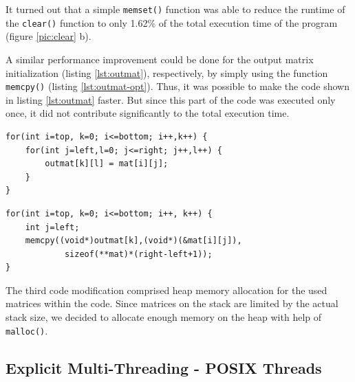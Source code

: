 \documentclass[conference]{IEEEtran}
\begin{document}
It turned out that a simple \texttt{memset()} function was able to reduce the runtime of the \texttt{clear()} function to only 1.62\% of the total execution time of the program (figure \ref{pic:clear} b).

A similar performance improvement could be done for the output matrix initialization (listing \ref{lst:outmat}), respectively, by simply using the function \texttt{memcpy()} (listing \ref{lst:outmat-opt}). Thus, it was possible to make the code shown in listing \ref{lst:outmat} faster. But since this part of the code was executed only once, it did not contribute significantly to the total execution time. 

\begin{center}
   \begin{lstlisting}[captionpos=b, caption=Initial Implementation: Initialize Output Matrix, label=lst:outmat]
for(int i=top, k=0; i<=bottom; i++,k++) {     
    for(int j=left,l=0; j<=right; j++,l++) {
        outmat[k][l] = mat[i][j];              
    }                                          
}                                              
   \end{lstlisting}
\end{center}

\begin{center}
   \begin{lstlisting}[captionpos=b, caption=Optimized Implementation: Initialize Output Matrix, label=lst:outmat-opt]  
for(int i=top, k=0; i<=bottom; i++, k++) {                                       
    int j=left;                                                                                    
    memcpy((void*)outmat[k],(void*)(&mat[i][j]),
            sizeof(**mat)*(right-left+1));                                          
}                                                 
   \end{lstlisting}
\end{center}
   
The third code modification comprised heap memory allocation for the used matrices within the code. Since matrices on the stack are limited by the actual stack size, we decided to allocate enough memory on the heap with help of \texttt{malloc()}.

   
\subsection{Explicit Multi-Threading - POSIX Threads}
\label{sec:impl:pthread}
\end{document}
